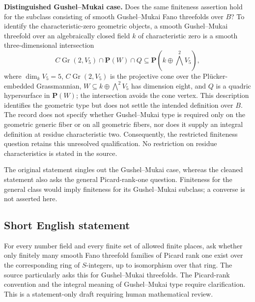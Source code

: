 \documentclass[11pt]{article}
\begin{document}
\textbf{Distinguished Gushel--Mukai case.} Does the same finiteness assertion hold for the subclass consisting of smooth Gushel--Mukai Fano threefolds over \(B\)? To identify the characteristic-zero geometric objects, a smooth Gushel--Mukai threefold over an algebraically closed field \(k\) of characteristic zero is a smooth three-dimensional intersection
\[
C\operatorname{Gr}(2,V_5)\cap\mathbf P(W)\cap Q
\subseteq\mathbf P(k\oplus\textstyle\bigwedge^2 V_5),
\]
where \(\dim_k V_5=5\), \(C\operatorname{Gr}(2,V_5)\) is the projective cone over the Pl\"ucker-embedded Grassmannian, \(W\subseteq k\oplus\bigwedge^2 V_5\) has dimension eight, and \(Q\) is a quadric hypersurface in \(\mathbf P(W)\); the intersection avoids the cone vertex. This description identifies the geometric type but does not settle the intended definition over \(B\). The record does not specify whether Gushel--Mukai type is required only on the geometric generic fiber or on all geometric fibers, nor does it supply an integral definition at residue characteristic two. Consequently, the restricted finiteness question retains this unresolved qualification. No restriction on residue characteristics is stated in the source.

The original statement singles out the Gushel--Mukai case, whereas the cleaned statement also asks the general Picard-rank-one question. Finiteness for the general class would imply finiteness for its Gushel--Mukai subclass; a converse is not asserted here.
\subsection{Short English statement}
For every number field and every finite set of allowed finite places, ask whether only finitely many smooth Fano threefold families of Picard rank one exist over the corresponding ring of \(S\)-integers, up to isomorphism over that ring. The source particularly asks this for Gushel--Mukai threefolds. The Picard-rank convention and the integral meaning of Gushel--Mukai type require clarification. This is a statement-only draft requiring human mathematical review.
\end{document}
